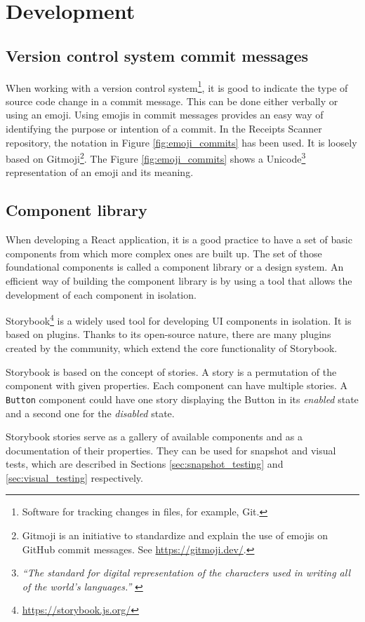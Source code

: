 \documentclass[
  digital, %
  table,   %
  oneside, %
  lof,     %
  lot,     %
]{fithesis3}
\begin{document}
\chapter{Development}
\section{Version control system commit messages}
When working with a version control system\footnote{Software for tracking changes in files, for example, Git.}, it is good to indicate the type of source code change in a commit message. This can be done either verbally or using an emoji.
Using emojis in commit messages provides an easy way of identifying the purpose or intention of a commit. In the Receipts Scanner repository, the notation in Figure \ref{fig:emoji_commits} has been used. It is loosely based on Gitmoji\footnote{Gitmoji is an initiative to standardize and explain the use of emojis on GitHub commit messages. See \url{https://gitmoji.dev/}.}. The Figure \ref{fig:emoji_commits} shows a Unicode\footnote{\textit{``The standard for digital representation of the characters used in writing all of the world's languages.''} \cite{Unicode}} representation of an emoji and its meaning.

\section{Component library}
\label{sec:component_library}
When developing a React application, it is a good practice to have a set of basic components from which more complex ones are built up. The set of those foundational components is called a component library or a design system. An efficient way of building the component library is by using a tool that allows the development of each component in isolation. 

Storybook\footnote{\url{https://storybook.js.org/}} is a widely used tool for developing UI components in isolation. It is based on plugins. Thanks to its open-source nature, there are many plugins created by the community, which extend the core functionality of Storybook.

Storybook is based on the concept of stories. A story is a permutation of the component with given properties. Each component can have multiple stories. A \texttt{Button} component could have one story displaying the Button in its \textit{enabled} state and a second one for the \textit{disabled} state.

Storybook stories serve as a gallery of available components and as a documentation of their properties. They can be used for snapshot and visual tests, which are described in Sections \ref{sec:snapshot_testing} and \ref{sec:visual_testing} respectively.
\end{document}
